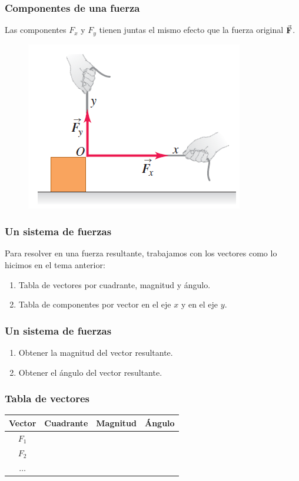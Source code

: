 \documentclass[14pt]{beamer}
\begin{document}
\begin{frame}
\frametitle{Componentes de una fuerza}
Las componentes $F_{x}$ y $F_{y}$ tienen juntas el mismo efecto que la fuerza original $\va{F}$.
\pause
\begin{figure}
    \centering
    \includegraphics[scale=0.65]{Imagenes/Fuerza_08.png}
\end{figure}
\end{frame}
\begin{frame}
\frametitle{Un sistema de fuerzas}
Para resolver en una fuerza resultante, trabajamos con los vectores como lo hicimos en el tema anterior:
\pause
{}
\begin{enumerate}[<+->]
\item Tabla de vectores por cuadrante, magnitud y ángulo.
\item Tabla de componentes por vector en el eje $x$ y en el eje $y$.
\seti
\end{enumerate}
\end{frame}
\begin{frame}
\frametitle{Un sistema de fuerzas}
\begin{enumerate}[<+->]    
\conti
\item Obtener la magnitud del vector resultante.
\item Obtener el ángulo del vector resultante.
\end{enumerate}
\end{frame}
\begin{frame}
\frametitle{Tabla de vectores}
\begin{table}
\centering
\begin{tabular}{c | c | c | c}
Vector & Cuadrante & Magnitud & Ángulo \\ \hline
$F_{1}$ & & & \\ \hline
$F_{2}$ & & & \\ \hline
$\ldots$ & & & \\ \hline 
\end{tabular}
\end{table}
\end{frame}
\end{document}
